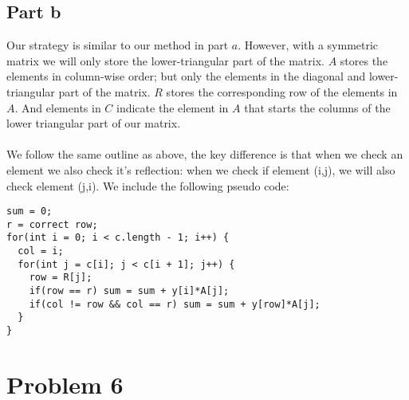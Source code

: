 \documentclass{article}\usepackage[]{graphicx}\usepackage[]{color}
\begin{document}
\subsection*{Part b}
Our strategy is similar to our method in part $a$.  However, with a symmetric matrix we will only store the lower-triangular part of the matrix.  $A$ stores the elements in column-wise order; but only the elements in the diagonal and lower-triangular part of the matrix.  $R$ stores the corresponding row of the elements in $A$.  And elements in $C$ indicate the element in $A$ that starts the columns of the lower triangular part of our matrix.\\
\\
We follow the same outline as above, the key difference is that when we check an element we also check it's reflection: when we check if element (i,j), we will also check element (j,i).  We include the following pseudo code:
\begin{verbatim}
sum = 0;
r = correct row;
for(int i = 0; i < c.length - 1; i++) {
  col = i;
  for(int j = c[i]; j < c[i + 1]; j++) {
    row = R[j];
    if(row == r) sum = sum + y[i]*A[j];
    if(col != row && col == r) sum = sum + y[row]*A[j];
  }
}
\end{verbatim}


\section*{Problem 6}
\end{document}
